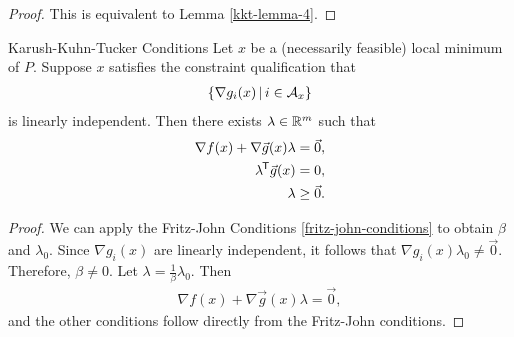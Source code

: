 \begin{proof}
    This is equivalent to Lemma \ref{kkt-lemma-4}.
\end{proof}

\begin{thm}{Karush-Kuhn-Tucker Conditions}\label{kkt-conditions}\proofbreak
    Let $x$ be a (necessarily feasible) local minimum of $P$. Suppose $x$ satisfies the constraint qualification that
    \begin{align}
        \left\{\nabla g_i(x) \,\middle|\, i \in \mathcal{A}_x\right\}
    \end{align}
    is linearly independent. Then there exists $\lambda \in \mathbb{R}^m$ such that
    \begin{align*}
        \nabla f(x) + \nabla \vec{g}(x)\lambda = \vec{0}, \\
        {\lambda}^{\mkern-1.5mu\mathsf{T}}\vec{g}(x) = 0, \\
        \lambda \geq \vec{0}.
    \end{align*}
\end{thm}

\begin{proof}
    We can apply the Fritz-John Conditions \ref{fritz-john-conditions} to obtain $\beta$ and $\lambda_0$. Since $\nabla g_i(x)$ are linearly independent, it follows that $\nabla g_i(x)\lambda_0 \neq \vec{0}$. Therefore, $\beta \neq 0$. Let $\lambda = \frac{1}{\beta}\lambda_0$. Then
    \begin{align*}
        \nabla f(x) + \nabla \vec{g}(x)\lambda = \vec{0},
    \end{align*}
    and the other conditions follow directly from the Fritz-John conditions.
\end{proof}

